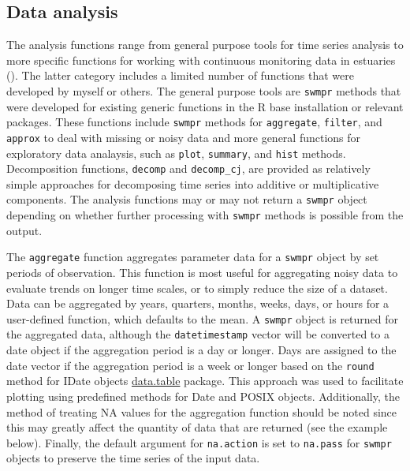 \documentclass[10pt,letterpaper]{article}\usepackage[]{graphicx}\usepackage[]{color}
\begin{document}
\subsection*{Data analysis}

The analysis functions range from general purpose tools for time series analysis to more specific functions for working with continuous monitoring data in estuaries ().  The latter category includes a limited number of functions that were developed by myself or others.  The general purpose tools are \texttt{swmpr} methods that were developed for existing generic functions in the R base installation or relevant packages.  These functions include \texttt{swmpr} methods for \texttt{aggregate}, \texttt{filter}, and \texttt{approx} to deal with missing or noisy data and more general functions for exploratory data analaysis, such as \texttt{plot}, \texttt{summary}, and \texttt{hist} methods.  Decomposition functions, \texttt{decomp} and \texttt{decomp\_cj}, are provided as relatively simple approaches for decomposing time series into additive or multiplicative components. The analysis functions may or may not return a \texttt{swmpr} object depending on whether further processing with \texttt{swmpr} methods is possible from the output.    

The \texttt{aggregate} function aggregates parameter data for a \texttt{swmpr} object by set periods of observation.  This function is most useful for aggregating noisy data to evaluate trends on longer time scales, or to simply reduce the size of a dataset.  Data can be aggregated by years, quarters, months, weeks, days, or hours for a user-defined function, which defaults to the mean.  A \texttt{swmpr} object is returned for the aggregated data, although the \texttt{datetimestamp} vector will be converted to a date object if the aggregation period is a day or longer.  Days are assigned to the date vector if the aggregation period is a week or longer based on the \texttt{round} method for IDate objects \href{http://cran.r-project.org/web/packages/data.table/index.html}{data.table} package.  This approach was used to facilitate plotting using predefined methods for Date and POSIX objects.  Additionally, the method of treating NA values for the aggregation function should be noted since this may greatly affect the quantity of data that are returned (see the example below).  Finally, the default argument for \texttt{na.action} is set to \texttt{na.pass} for \texttt{swmpr} objects to preserve the time series of the input data.
\end{document}
